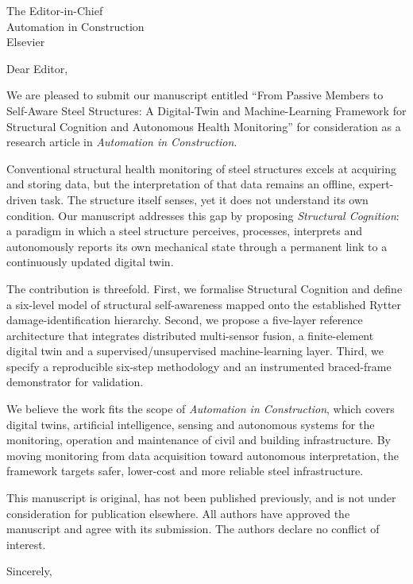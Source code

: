 \documentclass[11pt]{letter}
\begin{document}
\begin{letter}{The Editor-in-Chief\\ Automation in Construction\\ Elsevier}
\opening{Dear Editor,}

We are pleased to submit our manuscript entitled ``From Passive Members to
Self-Aware Steel Structures: A Digital-Twin and Machine-Learning Framework for
Structural Cognition and Autonomous Health Monitoring'' for consideration as a
research article in \emph{Automation in Construction}.

Conventional structural health monitoring of steel structures excels at acquiring
and storing data, but the interpretation of that data remains an offline,
expert-driven task. The structure itself senses, yet it does not understand its
own condition. Our manuscript addresses this gap by proposing \emph{Structural
Cognition}: a paradigm in which a steel structure perceives, processes, interprets
and autonomously reports its own mechanical state through a permanent link to a
continuously updated digital twin.

The contribution is threefold. First, we formalise Structural Cognition and define
a six-level model of structural self-awareness mapped onto the established Rytter
damage-identification hierarchy. Second, we propose a five-layer reference
architecture that integrates distributed multi-sensor fusion, a finite-element
digital twin and a supervised/unsupervised machine-learning layer. Third, we
specify a reproducible six-step methodology and an instrumented braced-frame
demonstrator for validation.

We believe the work fits the scope of \emph{Automation in Construction}, which
covers digital twins, artificial intelligence, sensing and autonomous systems for
the monitoring, operation and maintenance of civil and building infrastructure. By
moving monitoring from data acquisition toward autonomous interpretation, the
framework targets safer, lower-cost and more reliable steel infrastructure.

This manuscript is original, has not been published previously, and is not under
consideration for publication elsewhere. All authors have approved the manuscript
and agree with its submission. The authors declare no conflict of interest.

\closing{Sincerely,}
\end{letter}
\end{document}
